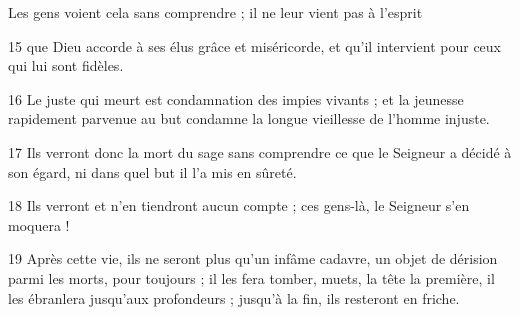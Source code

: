 Les gens voient cela sans comprendre ; il ne leur vient pas à l’esprit

15 que Dieu accorde à ses élus grâce et miséricorde, et qu’il intervient pour ceux qui lui sont fidèles.

16 Le juste qui meurt est condamnation des impies vivants ; et la jeunesse rapidement parvenue au but condamne la longue vieillesse de l’homme injuste.

17 Ils verront donc la mort du sage sans comprendre ce que le Seigneur a décidé à son égard, ni dans quel but il l’a mis en sûreté.

18 Ils verront et n’en tiendront aucun compte ; ces gens-là, le Seigneur s’en moquera !

19 Après cette vie, ils ne seront plus qu’un infâme cadavre, un objet de dérision parmi les morts, pour toujours ; il les fera tomber, muets, la tête la première, il les ébranlera jusqu’aux profondeurs ; jusqu’à la fin, ils resteront en friche.